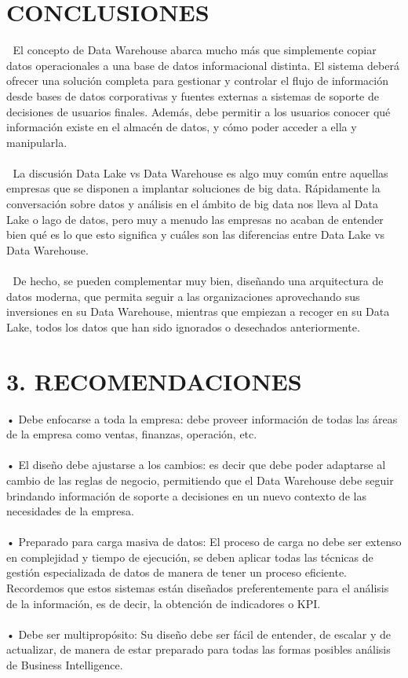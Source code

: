 \section{CONCLUSIONES}
\item{	El concepto de Data Warehouse abarca mucho más que simplemente copiar datos operacionales a una base de datos informacional distinta. El sistema deberá ofrecer una solución completa para gestionar y controlar el flujo de información desde bases de datos corporativas y fuentes externas a sistemas de soporte de decisiones de usuarios finales. Además, debe permitir a los usuarios conocer qué información existe en el almacén de datos, y cómo poder acceder a ella y manipularla.\\\\
	La discusión Data Lake vs Data Warehouse es algo muy común entre aquellas empresas que se disponen a implantar soluciones de big data. Rápidamente la conversación sobre datos y análisis en el ámbito de big data nos lleva al Data Lake o lago de datos, pero muy a menudo las empresas no acaban de entender bien qué es lo que esto significa y cuáles son las diferencias entre Data Lake vs Data Warehouse.\\\\
	De hecho, se pueden complementar muy bien, diseñando una arquitectura de datos moderna, que permita seguir a las organizaciones aprovechando sus inversiones en su Data Warehouse, mientras que empiezan a recoger en su Data Lake, todos los datos que han sido ignorados o desechados anteriormente.
}

\section{3.	RECOMENDACIONES }
\item{•	Debe enfocarse a toda la empresa: debe proveer información de todas las áreas de la empresa como ventas, finanzas, operación, etc.\\\\
•	El diseño debe ajustarse a los cambios: es decir que debe poder adaptarse al cambio de las reglas de negocio, permitiendo que el Data Warehouse debe seguir brindando información de soporte a decisiones en un nuevo contexto de las necesidades de la empresa.\\\\
•	Preparado para carga masiva de datos: El proceso de carga no debe ser extenso en complejidad y tiempo de ejecución, se deben aplicar todas las técnicas de gestión especializada de datos de manera de tener un proceso eficiente. Recordemos que estos sistemas están diseñados preferentemente para el análisis de la información, es de decir, la obtención de indicadores o KPI.\\\\
•	Debe ser multipropósito: Su diseño debe ser fácil de entender, de escalar y de actualizar, de manera de estar preparado para todas las formas posibles análisis de Business Intelligence.
}

